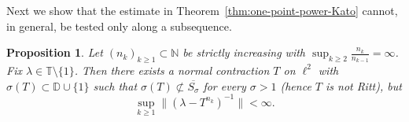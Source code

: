 \documentclass[11pt]{amsart}
\numberwithin{equation}{section}
\newtheorem{proposition}[theorem]{Proposition}
\theoremstyle{definition}
\theoremstyle{plain}
\def\T{\mathbb{T}}
\def\D{\mathbb{D}}
\begin{document}

Next we show
that the estimate in 
Theorem~\ref{thm:one-point-power-Kato}
cannot, in general, be tested
only along a subsequence.

\begin{proposition}
\label{prop:unbounded_quotients_subseq_resolvent}
Let $(n_k)_{k \ge 1}\subset \mathbb N$ be strictly increasing with $\sup_{k\ge 2}\frac{n_k}{n_{k-1}}=\infty$.
Fix $\lambda\in\T\setminus\{1\}$.
Then there exists a normal contraction $T$ on $\ell^2$ with $\sigma(T)\subset\D\cup\{1\}$ such that \(\sigma(T)\not\subset\overline{S_\sigma}\) for every \(\sigma>1\) (hence $T$ is not Ritt), but
\[
\sup_{k\ge1}\|(\lambda -T^{n_k})^{-1}\|<\infty.
\]
\end{proposition}
\end{document}
